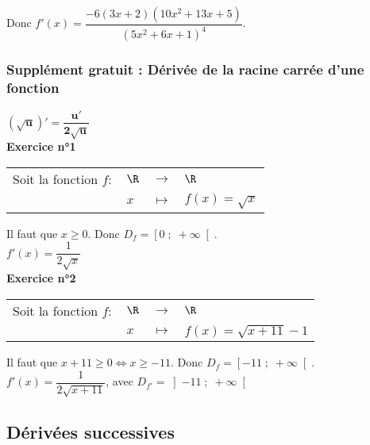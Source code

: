 Donc $f'(x) = \dfrac{-6\left(3x + 2\right)\left(10x^2 + 13x + 5\right)}{\left(5x^2 + 6x + 1\right)^4}$.

\subsubsection{Supplément gratuit : Dérivée de la racine carrée d'une fonction}

$\mathbf{\left(\sqrt{u}\right)' = \dfrac{u'}{2\sqrt{u}}}$ \\

\textbf{Exercice n°1} \\

\begin{tabular}{llll}
Soit la fonction $f :$ & $\R$ & $\longrightarrow$ & $\R$ \\
& $x$ & $\longmapsto$ & $f(x) =  \sqrt{x} $ \\
\end{tabular}

\vspace*{.3cm}

Il faut que $x \geqslant 0$. Donc $D_f = \left[0 \; ; \; +\infty \right[$. \\

$f'(x) = \dfrac{1}{2\sqrt{x}}$ \\

\textbf{Exercice n°2} \\

\begin{tabular}{llll}
Soit la fonction $f :$ & $\R$ & $\longrightarrow$ & $\R$ \\
& $x$ & $\longmapsto$ & $f(x) =  \sqrt{x+11} - 1 $ \\
\end{tabular}

\vspace*{.3cm}

Il faut que $x +11 \geqslant 0 \Longleftrightarrow x \geqslant -11$. Donc $D_f = \left[-11 \; ; \; +\infty \right[$. \\

$f'(x) = \dfrac{1}{2\sqrt{x + 11}}$, avec $D_{f'} = \left]-11 \; ; \; +\infty \right[$

\vspace*{-5cm}

\newpage

%
%
%
%
%
%
%
%
%
%
%
%
%
%
%
%
%
\subsection{Dérivées successives}

